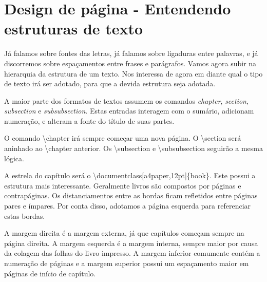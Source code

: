 \chapter[Design de página]{Design de página - Entendendo estruturas de texto}
Já falamos sobre fontes das letras, já falamos sobre ligaduras entre palavras, e já discorremos sobre espaçamentos entre frases e parágrafos.
Vamos agora subir na hierarquia da estrutura de um texto.
Nos interessa de agora em diante qual o tipo de texto irá ser adotado, para que a devida estrutura seja adotada.

A maior parte dos formatos de textos assumem os comandos \emph{chapter}, \emph{section}, \emph{subsection} e \emph{subsubsection}.
Estas entradas interagem com o sumário, adicionam numeração, e alteram a fonte do título de suas partes.

O comando \textbackslash chapter irá sempre começar uma nova página.
O \textbackslash section será aninhado ao \textbackslash chapter anterior.
Os \textbackslash subsection e \textbackslash subsubsection seguirão a mesma lógica.

A estrela do capítulo será o \textbackslash documentclass[a4paper,12pt]\{book\}.
Este possui a estrutura mais interessante.
Geralmente livros são compostos por páginas e contrapáginas.
Os distanciamentos entre as bordas ficam refletidos entre páginas pares e ímpares.
Por conta disso, adotamos a página esquerda para referenciar estas bordas.

A margem direita é a margem externa, já que capítulos começam sempre na página direita.
A margem esquerda é a margem interna, sempre maior por causa da colagem das folhas do livro impresso.
A margem inferior comumente contém a numeração de páginas e a margem superior possui um espaçamento maior em páginas de início de capítulo.



